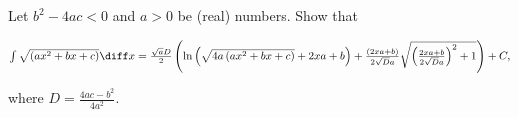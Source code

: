 \label{problemIntegrate sqrt(ax^2+bx+c)dx}
Let $b^2-4ac<0$ and $a>0$ be (real) numbers. Show that 

\noindent $
\int \sqrt{\left(a x^2+b x+c\right)}\diff x = \frac{\sqrt{a}D}{2}\left(\ln \left(\sqrt{4a\left(a x^2+b x+c\right)}+2x a+b\right)+\frac{\left(2x a+b\right)}{2\sqrt{D}a}\sqrt{\left(\frac{2 x a+b}{2\sqrt{D}a}\right)^2+1}\right)+C,
$

where 
$\displaystyle D=\frac{4a c-b^2}{4a^2}$.




